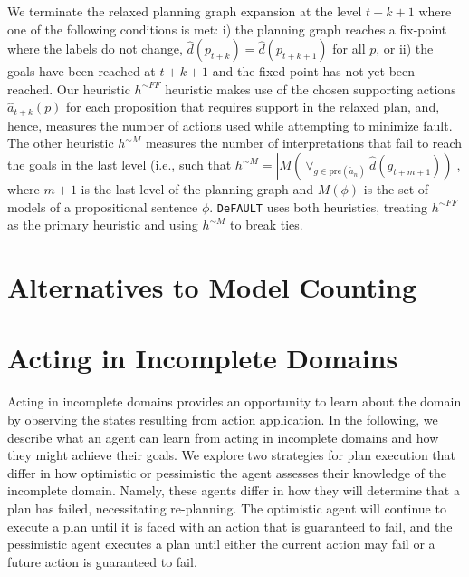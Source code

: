 \documentclass{article}
\def\und#1{\noindent{\bf #1}:}
\newenvironment{packed_itemize}{
\begin{itemize}
  \setlength{\itemsep}{1pt}
  \setlength{\parskip}{0pt}
  \setlength{\parsep}{0pt}
}{\end{itemize}}
\def\FFRISKY{{\tt DeFAULT}}
\def\und#1{\medskip{\noindent\bf #1:}}
\begin{document}
\und{Heuristic Computation}   We terminate the relaxed planning graph expansion at the level $t+k+1$ where one of the following conditions is met: i) the planning graph reaches a fix-point where the
labels do not change, $\hat{d}(p_{t+k}) = \hat{d}(p_{t+k+1})$ for all $p$, or ii) the goals have been reached at $t+k+1$ and the fixed point has not yet been reached. Our heuristic $h^{\sim FF}$ heuristic makes use of the chosen supporting actions $\hat{a}_{t+k}(p)$ for each proposition that requires support in the relaxed plan, and, hence, measures the number of actions used while attempting to minimize fault.  The other heuristic
$h^{\sim M}$ measures the number of interpretations that fail to reach the goals in the last level (i.e., such that  $h^{\sim M} = |M(\vee_{g \in \text{pre}(\tilde{a}_n)}\hat{d}(g_{t+m+1}))|$, where $m+1$ is the last level of the planning graph and $M(\phi)$ is the set of models of a propositional sentence $\phi$.  \FFRISKY{} uses both heuristics, treating  $h^{\sim FF}$ as the primary heuristic and using $h^{\sim M}$ to break ties.

\section{Alternatives to Model Counting}

\section{Acting in Incomplete Domains} Acting in incomplete domains provides an opportunity to learn about the domain by observing the states resulting from action application.  In the following, we describe what an agent can learn from acting in incomplete domains and how they might achieve their goals.  We explore two strategies for plan execution that differ in how optimistic or pessimistic the agent assesses their knowledge of the incomplete domain.  Namely, these agents differ in how they will determine that a plan has failed, necessitating re-planning.  The optimistic agent will continue to execute a plan until it is faced with an action that is guaranteed to fail, and the pessimistic agent executes a plan until either the current action may fail or a future action is guaranteed to fail.


\end{document}
